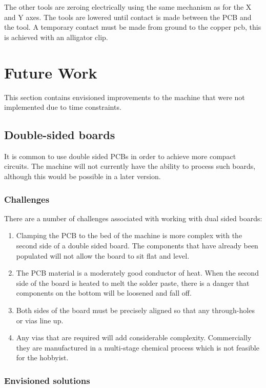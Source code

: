 \documentclass[a4paper,11pt]{article}  %
\begin{document}
The other tools are zeroing electrically using the same mechanism as for the X and Y axes. The tools are lowered until contact is made between the PCB and the tool. A temporary contact must be made from ground
to the copper pcb, this is achieved with an alligator clip.

\section{Future Work}
This section contains envisioned improvements to the machine that were not implemented due to time constraints.

\subsection{Double-sided boards}
It is common to use double sided PCBs in order to achieve more compact circuits. The machine will not currently have the ability to process such boards, although this would be possible in a later version.

\subsubsection{Challenges}
There are a number of challenges associated with working with dual sided boards:

\begin{enumerate}
	\item	Clamping the PCB to the bed of the machine is more complex with the second side of a double sided board. The components that have
			already been populated will not allow the board to sit flat and level.
	\item	The PCB material is a moderately good conductor of heat. When the second side of the board is heated to melt the solder paste, there
			is a danger that components on the bottom will be loosened and fall off.
	\item	Both sides of the board must be precisely aligned so that any through-holes or vias line up.
	\item	Any vias that are required will add considerable complexity. Commercially they are manufactured in a multi-stage chemical process
			which is not feasible for the hobbyist.
\end{enumerate}

\subsubsection{Envisioned solutions}
\end{document}
